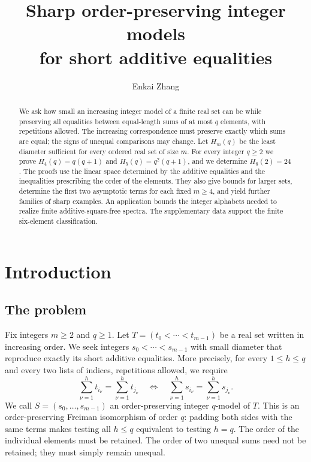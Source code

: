 \documentclass[11pt,reqno]{amsart}
\theoremstyle{plain}
\theoremstyle{definition}
\theoremstyle{plain}
\theoremstyle{plain}
\theoremstyle{plain}
\theoremstyle{plain}
\theoremstyle{plain}
\theoremstyle{plain}
\theoremstyle{definition}
\theoremstyle{definition}
\theoremstyle{definition}
\theoremstyle{plain}
\providecommand{\SuppPrefix}{}
\begin{document}
\hypertarget{article-start}{}
\renewcommand{\SuppPrefix}{Supplement }

\raggedbottom

\title[Sharp ordered integer models for short additive equalities]
      {Sharp order-preserving integer models \\ for short additive equalities}

\author{Enkai Zhang}
\address{University of Toronto Scarborough, Toronto, Ontario, Canada}


\begin{abstract}
We ask how small an increasing integer model of a finite real set can
be while preserving all equalities between equal-length sums of at most
$q$ elements, with repetitions allowed.
The increasing correspondence must preserve exactly which sums are equal;
the signs of unequal comparisons may change. Let $H_m(q)$ be the least
diameter sufficient for every ordered real set of size $m$.
For every integer $q\ge2$ we prove
$H_4(q)=q(q+1)$ and $H_5(q)=q^2(q+1)$, and we determine $H_6(2)=24$.
The proofs use the linear space determined by the additive equalities
and the inequalities prescribing the order of the elements.
They also give bounds for larger sets, determine the first two asymptotic
terms for each fixed $m\ge4$, and yield further families of sharp examples.
An application bounds the integer alphabets needed to realize finite
additive-square-free spectra. The supplementary data support the finite
six-element classification.
\end{abstract}

\maketitle
\enlargethispage{3pt}

\section{Introduction}\label{M-sec:intro}

\subsection{The problem}
Fix integers $m\ge2$ and $q\ge1$. Let $T=(t_0<\cdots<t_{m-1})$ be a real set written in increasing order.
We seek integers $s_0<\cdots<s_{m-1}$ with small diameter that reproduce
exactly its short additive equalities. More precisely, for every
$1\le h\le q$ and every two lists of indices, repetitions allowed, we require
\[
 \sum_{\nu=1}^h t_{i_\nu}=\sum_{\nu=1}^h t_{j_\nu}
 \quad\Longleftrightarrow\quad
 \sum_{\nu=1}^h s_{i_\nu}=\sum_{\nu=1}^h s_{j_\nu}.
\]
We call $S=(s_0,\ldots,s_{m-1})$ an order-preserving integer $q$-model of $T$. This is an
order-preserving Freiman isomorphism of order $q$: padding both sides with
the same terms makes testing all $h\le q$ equivalent to testing $h=q$.
The order of the individual elements must be retained. The order of two
unequal sums need not be retained; they must simply remain unequal.
\end{document}
